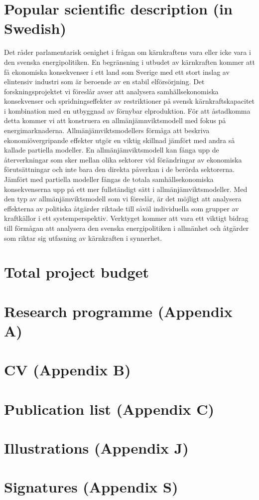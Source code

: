 \section{Popular scientific description (in Swedish)}
Det råder parlamentarisk oenighet i frågan om kärnkraftens vara eller icke vara i den svenska energipolitiken. En begränsning i utbudet av kärnkraften kommer att få ekonomiska konsekvenser i ett land som Sverige med ett stort inslag av elintensiv industri som är beroende av en stabil elförsörjning. Det forskningsprojektet vi föreslår avser att analysera samhällsekonomiska konsekvenser och spridningseffekter av restriktioner på svensk kärnkraftskapacitet i kombination med en utbyggnad av förnybar elproduktion. För att åstadkomma detta kommer vi att konstruera en allmänjämnviktsmodell med fokus på energimarknaderna. Allmänjämviktsmodellers förmåga att beskriva ekonomiövergripande effekter utgör en viktig skillnad jämfört med andra så kallade partiella modeller. En allmänjämviktsmodell kan fånga upp de återverkningar som sker mellan olika sektorer vid förändringar av ekonomiska förutsättningar och inte bara den direkta påverkan i de berörda sektorerna. Jämfört med partiella modeller fångas de totala samhällsekonomiska konsekvenserna upp på ett mer fullständigt sätt i allmänjämviktsmodeller. Med den typ av allmänjämviktsmodell som vi föreslår, är det möjligt att analysera effekterna av politiska åtgärder riktade till såväl individuella som grupper av kraftkällor i ett systemperspektiv. Verktyget kommer att vara ett viktigt bidrag till förmågan att analysera den svenska energipolitiken i allmänhet och åtgärder som riktar sig utfasning av kärnkraften i synnerhet.
\section{Total project budget}
\section{Research programme (Appendix A)}

\section{CV (Appendix B)}

\section{Publication list (Appendix C)}

\section{Illustrations (Appendix J)}

\section{Signatures (Appendix S)}



\pagebreak
{}





